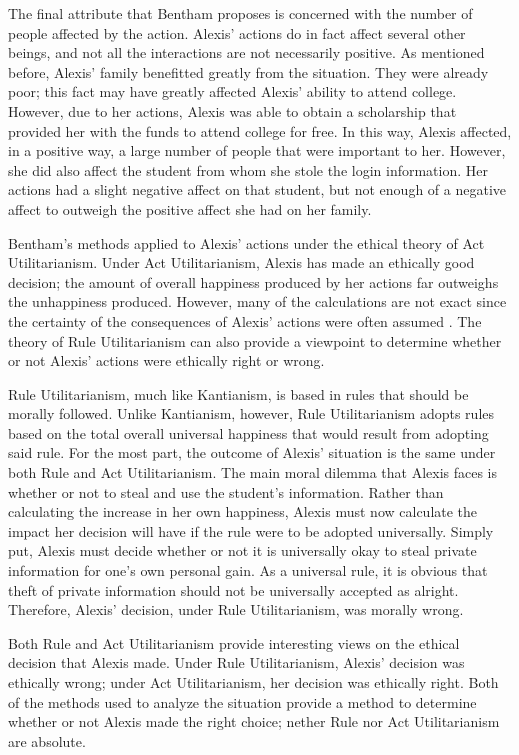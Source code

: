 \documentclass{paper}
\begin{document}
The final attribute that Bentham proposes is concerned with the number of people affected by the action. Alexis' actions do in fact affect several other beings, and not all the interactions are not necessarily positive. As mentioned before, Alexis' family benefitted greatly from the situation. They were already poor; this fact may have greatly affected Alexis' ability to attend college. However, due to her actions, Alexis was able to obtain a scholarship that provided her with the funds to attend college for free. In this way, Alexis affected, in a positive way, a large number of people that were important to her. However, she did also affect the student from whom she stole the login information. Her actions had a slight negative affect on that student, but not enough of a negative affect to outweigh the positive affect she had on her family.

Bentham's methods applied to Alexis' actions under the ethical theory of Act Utilitarianism. Under Act Utilitarianism, Alexis has made an ethically good decision; the amount of overall happiness produced by her actions far outweighs the unhappiness produced. However, many of the calculations are not exact since the certainty of the consequences of Alexis' actions were often assumed \cite[77]{ethics}. The theory of Rule Utilitarianism can also provide a viewpoint to determine whether or not Alexis' actions were ethically right or wrong.

Rule Utilitarianism, much like Kantianism, is based in rules that should be morally followed. Unlike Kantianism, however, Rule Utilitarianism adopts rules based on the total overall universal happiness that would result from adopting said rule. For the most part, the outcome of Alexis' situation is the same under both Rule and Act Utilitarianism. The main moral dilemma that Alexis faces is whether or not to steal and use the student's information. Rather than calculating the increase in her own happiness, Alexis must now calculate the impact her decision will have if the rule were to be adopted universally. Simply put, Alexis must decide whether or not it is universally okay to steal private information for one's own personal gain. As a universal rule, it is obvious that theft of private information should not be universally accepted as alright. Therefore, Alexis' decision, under Rule Utilitarianism, was morally wrong.

Both Rule and Act Utilitarianism provide interesting views on the ethical decision that Alexis made. Under Rule Utilitarianism, Alexis' decision was ethically wrong; under Act Utilitarianism, her decision was ethically right. Both of the methods used to analyze the situation provide a method to determine whether or not Alexis made the right choice; nether Rule nor Act Utilitarianism are absolute.

\newpage
\printbibliography
\end{document}
